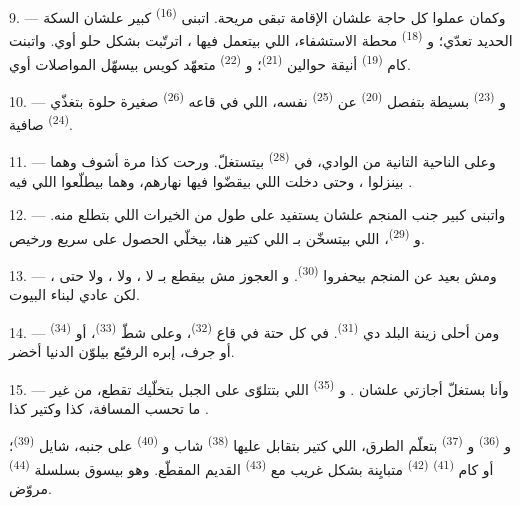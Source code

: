 9. --- وكمان عملوا كل حاجة علشان الإقامة تبقى مريحة. اتبنى 
\textsuperscript{(16)} كبير علشان السكة الحديد تعدّي؛ و
\textsuperscript{(18)} محطة الاستشفاء، اللي بيتعمل فيها ،
اترتّبت بشكل حلو أوي. واتبنت كام  \textsuperscript{(19)} أنيقة حوالين
 \textsuperscript{(21)}؛ و \textsuperscript{(22)}
متعهّد كويس بيسهّل المواصلات أوي.

10. --- و \textsuperscript{(23)} بسيطة بتفصل 
\textsuperscript{(20)} عن  \textsuperscript{(25)} نفسه، اللي في قاعه
 \textsuperscript{(26)} صغيرة حلوة بتغذّي 
\textsuperscript{(24)} صافية.

11. --- وعلى الناحية التانية من الوادي، في  \textsuperscript{(28)}
بيتستغلّ. ورحت كذا مرة أشوف  وهما بينزلوا ،
وحتى دخلت  اللي بيقضّوا فيها نهارهم، وهما بيطلّعوا 
اللي فيه .

12. --- واتبنى  كبير جنب المنجم علشان يستفيد على طول من الخيرات
اللي بتطلع منه. و \textsuperscript{(29)}، اللي بيتسخّن
بـ اللي كتير هنا، بيخلّي الحصول على  سريع
ورخيص.

13. --- ومش بعيد عن المنجم بيحفروا  \textsuperscript{(30)}.
و العجوز مش بيقطع بـ لا ، ولا
، ولا حتى ، لكن  عادي لبناء
البيوت.

14. --- ومن أحلى زينة البلد دي  \textsuperscript{(31)}. في كل حتة
في قاع  \textsuperscript{(32)}، وعلى شطّ 
\textsuperscript{(33)}، أو  \textsuperscript{(34)} أو جرف، إبره الرفيّع
بيلوّن الدنيا أخضر.

\VUsaut{3.0mm}
\VUsaut{3.0mm}

15. --- وأنا بستغلّ أجازتي علشان . و
\textsuperscript{(35)} اللي بتتلوّى على الجبل بتخلّيك تقطع، من غير ما تحسب المسافة،
كذا  وكتير كذا .

و \textsuperscript{(36)} و
\textsuperscript{(37)} بتعلّم الطرق، اللي كتير بتقابل عليها 
\textsuperscript{(38)} شاب و \textsuperscript{(40)} على جنبه، شايل
 \textsuperscript{(39)}؛ أو كام  \textsuperscript{(41)}
 \textsuperscript{(42)} متبايِنة بشكل غريب مع 
\textsuperscript{(43)} القديم المقطّع. وهو بيسوق بسلسلة  \textsuperscript{(44)}
مروّض.

